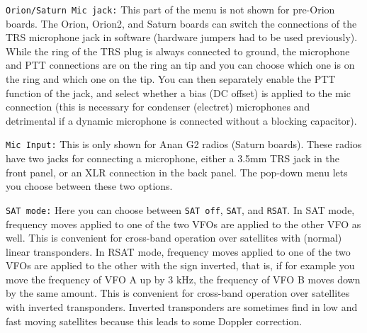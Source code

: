 \documentclass[12pt]{book}
\def\rett#1{\texttt{\color{red}#1}}
\begin{document}
\rett{Orion/Saturn Mic jack:} This part of the menu is not shown for pre-Orion boards.
The Orion, Orion2, and Saturn boards can switch the connections
of the TRS microphone jack in software (hardware jumpers had to be used previously).
While the ring of the TRS plug is always connected to ground, the microphone and PTT connections are on the
ring an tip and you can choose which one is on the ring and which one on the tip. You can then separately
enable the PTT function of the jack, and select whether a bias (DC offset) is applied to the mic connection
(this is necessary for condenser (electret) microphones and detrimental if a dynamic microphone is connected without
a blocking capacitor).

\rett{Mic Input:} This is only shown for Anan G2 radios (Saturn boards).
These radios have two jacks for connecting a
microphone, either a 3.5mm TRS jack in the front panel, or an XLR connection in the back panel. The pop-down
menu lets you choose between these two options.

\rett{SAT mode:} Here you can choose between \texttt{SAT off}, \texttt{SAT}, and \texttt{RSAT}. In SAT mode,
frequency moves applied to one of the two VFOs are applied to the other VFO as well. This is convenient
for cross-band operation over satellites with (normal) linear transponders. In RSAT mode, frequency
moves applied to one of the two VFOs are applied to the other with the sign inverted, that is, if
for example you move the frequency of VFO A up by 3 kHz, the frequency of VFO B moves down by the same
amount. This is convenient for cross-band operation over satellites with inverted transponders. Inverted
transponders are sometimes find in low and fast moving satellites because this leads to some Doppler
correction.
\end{document}
